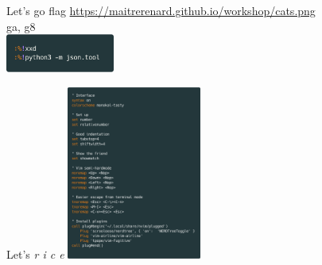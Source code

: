 \documentclass[10pt]{beamer}
\begin{document}
	\begin{frame}{Let's go flag}
		\center
		\href{https://maitrerenard.github.io/workshop/cats.png}{https://maitrerenard.github.io/workshop/cats.png}\\
		\vspace{1pt}
		ga, g8\\
		\vspace{1pt}
		\includegraphics[height=48]{img/tools.png}\\
	\end{frame}

	\begin{frame}{Let's \textit{r i c e}}
		\center
		\includegraphics[height=216]{img/init-vim.png}
	\end{frame}
\end{document}

